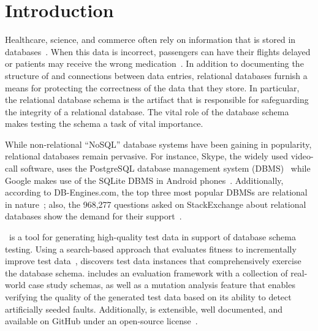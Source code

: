 \section{Introduction}\label{sec:intro}


Healthcare, science, and commerce often rely on information that is stored in
databases~\cite{kapfhammer2007comprehensive}.  When this data is incorrect, passengers can have their flights delayed or
patients may receive the wrong medication~\cite{databasebook}.  In addition to documenting the structure of and
connections between data entries, relational databases furnish a means for protecting the correctness of the data that
they store.  In particular, the relational database schema is the artifact that is responsible for safeguarding the
integrity of a relational database. The vital role of the database schema makes testing the schema a task of vital
importance.


While non-relational ``NoSQL'' database systems have been gaining in popularity, relational databases remain pervasive.
For instance, Skype, the widely used video-call software, uses the PostgreSQL database management system
(DBMS)~\cite{postgres} while Google makes use of the SQLite DBMS in Android phones~\cite{sqlite}.  Additionally,
according to DB-Engines.com, the top three most popular DBMSs are relational in nature~\cite{dbrank}; also, the 968,277
questions asked on StackExchange about relational databases show the demand for their support~\cite{stackexchange}.


\sa~is a tool for generating high-quality test data in support of database schema testing. Using a search-based approach
that evaluates fitness to incrementally improve test data~\cite{Korel:AVM}, {\sa} discovers test data instances that
comprehensively exercise the database schema.  {\sa} includes an evaluation framework with a collection of real-world
case study schemas, as well as a mutation analysis feature that enables verifying the quality of the generated test data
based on its ability to detect artificially seeded faults.  Additionally, {\sa} is extensible, well documented, and
available on GitHub under an open-source license~\cite{tool}.


